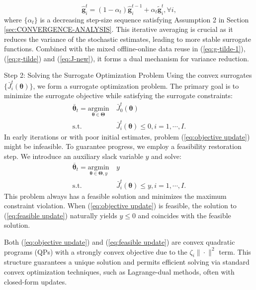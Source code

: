 \documentclass{IEEEtran}
\begin{document}
\begin{equation}
\hat{\boldsymbol{g}}_{i}^{t}=\left(1-\alpha_{t}\right)\hat{\boldsymbol{g}}_{i}^{t-1}+\alpha_{t}\tilde{\boldsymbol{g}}_{i}^{t},\forall i,\label{eq:g-average}
\end{equation}
where $\{\alpha_{t}\}$ is a decreasing step-size sequence satisfying Assumption 2 in Section \ref{sec:CONVERGENCE-ANALYSIS}. This iterative averaging is crucial as it reduces the variance of the stochastic estimates, leading to more stable surrogate functions. Combined with the mixed offline-online data reuse in (\ref{eq:g-tilde-1}), (\ref{eq:g-tilde}) and (\ref{eq:J-new}), it forms a dual mechanism for variance reduction.

Step 2: Solving the Surrogate Optimization Problem Using the convex surrogates $\{\bar{J}_{i}^{t}(\boldsymbol{\theta})\}$, we form a surrogate optimization problem. The primary goal is to minimize the surrogate objective while satisfying the surrogate constraints:
\begin{align}
\bar{\boldsymbol{\theta}}_{t}=\underset{\boldsymbol{\theta}\in\mathbf{\Theta}}{\textrm{argmin}}\  & \bar{J}_{0}^{t}\left(\boldsymbol{\theta}\right)\label{eq:objective update}\\
\textrm{s.t.}\  & \bar{J}_{i}^{t}\left(\boldsymbol{\theta}\right)\leq0,i=1,\cdots,I.\nonumber
\end{align}
In early iterations or with poor initial estimates, problem (\ref{eq:objective update}) might be infeasible. To guarantee progress, we employ a feasibility restoration step. We introduce an auxiliary slack variable $y$ and solve:
\begin{align}
\bar{\boldsymbol{\theta}}_{t}=\underset{\boldsymbol{\theta}\in\mathbf{\Theta},y}{\textrm{argmin}}\  & y\label{eq:feasible update}\\
\textrm{s.t.}\  & \bar{J}_{i}^{t}\left(\boldsymbol{\theta}\right)\leq y,i=1,\cdots,I.\nonumber
\end{align}
This problem always has a feasible solution and minimizes the maximum constraint violation. When (\ref{eq:objective update}) is feasible, the solution to (\ref{eq:feasible update}) naturally yields $y\leq0$ and coincides with the feasible solution.

Both (\ref{eq:objective update}) and (\ref{eq:feasible update}) are convex quadratic programs (QPs) with a strongly convex objective due to the $\zeta_{i}\|\cdot\|^{2}$ term. This structure guarantees a unique solution and permits efficient solving via standard convex optimization techniques, such as Lagrange-dual methods, often with closed-form updates.
\end{document}

